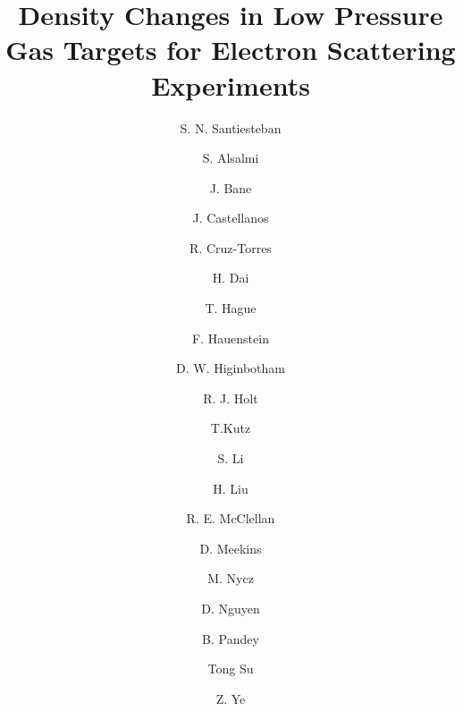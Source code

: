 \documentclass[final,5p,times,twocolumn]{elsarticle}
\begin{document}
\begin{frontmatter}



\title{Density Changes in Low Pressure Gas Targets for Electron Scattering Experiments}

\author[UNH]{S. N. Santiesteban}
\author[Kent]{S. Alsalmi}
\author[TN]{J. Bane}
\author[FI]{J. Castellanos}
\author[MIT]{R. Cruz-Torres}
\author[VT]{H. Dai}
\author[Kent]{T. Hague}
\author[OD]{F. Hauenstein}
\author[JLab]{D. W. Higinbotham}
\author[argonne,CalTech]{R. J. Holt}
\author[SB]{T.Kutz}
\author[UNH]{S. Li}
\author[COL]{H. Liu}
\author[JLab]{R. E. McClellan}
\author[JLab]{D. Meekins}
\author[Kent]{M. Nycz}
\author[UVa]{ D. Nguyen}
\author[hampton]{B. Pandey}
\author[Kent]{Tong Su}
\author[argonne]{Z. Ye}


\address[Kent]{Kent State University, Kent, OH 44240}
\address[TN]{The University of Tennessee, Knoxville, Tennessee 37996, USA}
\address[FI]{Florida International University, Miami, FL 33199 USA}
\address[MIT]{Massachusetts Institute of Technology, Cambridge, Massachusetts 02139, USA}
\address[UNH]{University of New Hampshire, Durham, NH 03824 USA}
\address[VT]{Virginia Tech, Blacksburg, Virginia 24061}
\address[OD]{Old Dominion University, Norfolk, Virginia 23529, USA}
\address[COL]{Columbia University, New York, New York 10027, USA}
\address[JLab]{Jefferson Lab, Newport News, VA 23601 USA}
\address[SB]{Stony Brook University, Stony Brook, New York 11794, USA}
\address[UVA]{Department of Physics, University of Virginia, Charlottesville, Virginia 22904, USA}
\address[hampton]{Hampton University, Hampton, Virginia 23669, USA}
\address[argonne]{Physics Division, Argonne National Laboratory, Argonne, Illinois 60439, USA}
\address[CalTech]{The Division of Physics Mathematics and Astronomy, California Institute of Technology, Pasadena California 91125 USA}



\end{frontmatter}
\end{document}
